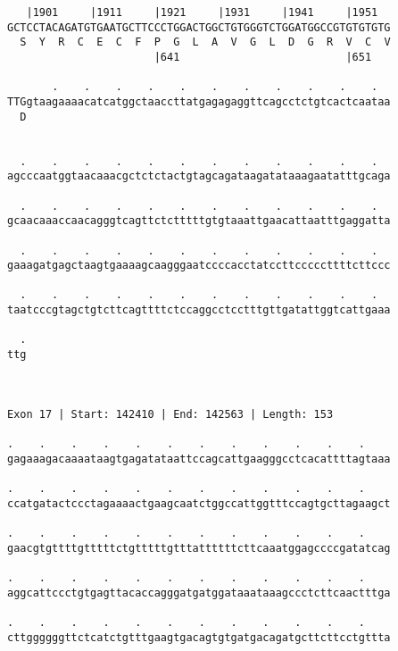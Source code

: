 \documentclass{article}
\begin{document}
\begin{Verbatim}
   |1901     |1911     |1921     |1931     |1941     |1951  
GCTCCTACAGATGTGAATGCTTCCCTGGACTGGCTGTGGGTCTGGATGGCCGTGTGTGTG
  S  Y  R  C  E  C  F  P  G  L  A  V  G  L  D  G  R  V  C  V
                       |641                          |651   
  
       .    .    .    .    .    .    .    .    .    .    .  
TTGgtaagaaaacatcatggctaaccttatgagagaggttcagcctctgtcactcaataa
  D                                                         
                                                            
  
  .    .    .    .    .    .    .    .    .    .    .    .  
agcccaatggtaacaaacgctctctactgtagcagataagatataaagaatatttgcaga
                                                            
  .    .    .    .    .    .    .    .    .    .    .    .  
gcaacaaaccaacagggtcagttctctttttgtgtaaattgaacattaatttgaggatta
                                                            
  .    .    .    .    .    .    .    .    .    .    .    .  
gaaagatgagctaagtgaaaagcaagggaatccccacctatccttcccccttttcttccc
                                                            
  .    .    .    .    .    .    .    .    .    .    .    .  
taatcccgtagctgtcttcagttttctccaggcctcctttgttgatattggtcattgaaa
                                                            
  .
ttg
   
   
 
Exon 17 | Start: 142410 | End: 142563 | Length: 153
 
.    .    .    .    .    .    .    .    .    .    .    .    
gagaaagacaaaataagtgagatataattccagcattgaagggcctcacattttagtaaa
                                                            
.    .    .    .    .    .    .    .    .    .    .    .    
ccatgatactccctagaaaactgaagcaatctggccattggtttccagtgcttagaagct
                                                            
.    .    .    .    .    .    .    .    .    .    .    .    
gaacgtgttttgtttttctgtttttgtttattttttcttcaaatggagccccgatatcag
                                                            
.    .    .    .    .    .    .    .    .    .    .    .    
aggcattccctgtgagttacaccagggatgatggataaataaagccctcttcaactttga
                                                            
.    .    .    .    .    .    .    .    .    .    .    .    
cttggggggttctcatctgtttgaagtgacagtgtgatgacagatgcttcttcctgttta
                                                            

\end{Verbatim}
\end{document}
